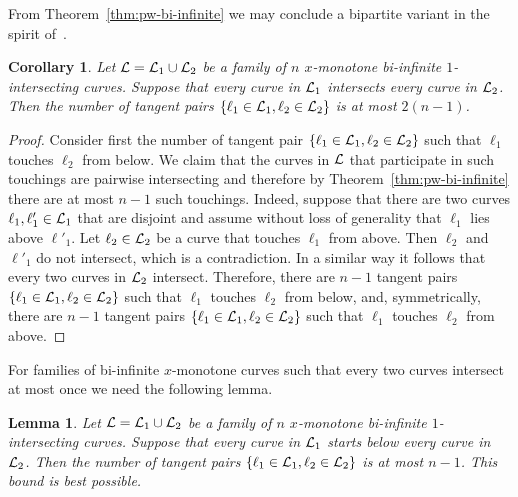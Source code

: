 \documentclass[11pt]{article}
\newtheorem{lemma}{Lemma}
\newtheorem{corollary}{Corollary}
\theoremstyle{definition}
\def\L{{\cal L}}
\begin{document}
From Theorem~\ref{thm:pw-bi-infinite} we may conclude a bipartite variant in the spirit of~\cite[Theorem 3.1]{lenses}.

\begin{corollary}
Let $\L=\L_1 \cup \L_2$ be a family of $n$ $x$-monotone bi-infinite $1$-intersecting curves.
Suppose that every curve in $\L_1$ intersects every curve in $\L_2$.
Then the number of tangent pairs $\{\ell_1 \in \L_1,\ell_2 \in \L_2\}$  is at most $2(n-1)$.
\end{corollary}

\begin{proof}
Consider first the number of tangent pair $\{\ell_1 \in \L_1,\ell_2 \in \L_2\}$ such that $\ell_1$ touches $\ell_2$ from below.
We claim that the curves in $\L$ that participate in such touchings are pairwise intersecting and therefore by Theorem~\ref{thm:pw-bi-infinite} there are at most $n-1$ such touchings.
Indeed, suppose that there are two curves $\ell_1,\ell'_1 \in \L_1$ that are disjoint and assume without loss of generality that $\ell_1$ lies above $\ell'_1$.
Let $\ell_2 \in \L_2$ be a curve that touches $\ell_1$ from above.
Then $\ell_2$ and $\ell'_1$ do not intersect, which is a contradiction.
In a similar way it follows that every two curves in $\L_2$ intersect.
Therefore, there are $n-1$ tangent pairs $\{\ell_1 \in \L_1,\ell_2 \in \L_2\}$ such that $\ell_1$ touches $\ell_2$ from below, and, symmetrically, there are $n-1$ tangent pairs $\{\ell_1 \in \L_1,\ell_2 \in \L_2\}$ such that $\ell_1$ touches $\ell_2$ from above.
\end{proof}

For families of bi-infinite $x$-monotone curves such that every two curves intersect at most once we need the following lemma.

\begin{lemma}\label{lemma:blues-above-reds}
Let $\L=\L_1 \cup \L_2$ be a family of $n$ $x$-monotone bi-infinite $1$-intersecting curves.
Suppose that every curve in $\L_1$ starts below every curve in $\L_2$.
Then the number of tangent pairs $\{\ell_1 \in \L_1,\ell_2 \in \L_2\}$  is at most $n-1$.
This bound is best possible.
\end{lemma}
\end{document}

